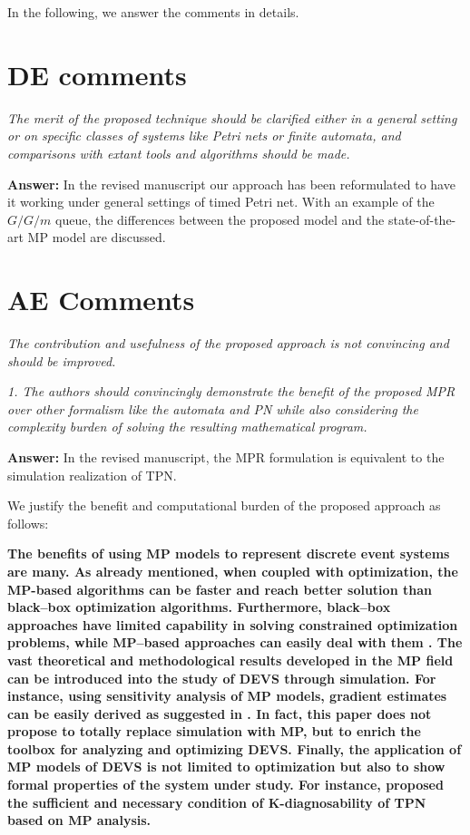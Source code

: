 \documentclass[suppldata]{interact}
\begin{document}
In the following, we answer the comments in details. 



\section{DE comments}
\textit{The merit of the proposed technique should be clarified either in a general setting or on specific classes of systems like Petri nets or finite automata, and comparisons with extant tools and algorithms should be made.}

\noindent
\textbf{Answer:} %
In the revised manuscript our approach %
has been reformulated to have it working under general settings of timed Petri net. With an example of the $G/G/m$ queue, the differences between the proposed model and the state-of-the-art MP model are discussed.


\section{AE Comments}
\textit{The contribution and usefulness of the proposed approach is not convincing and should be improved. }

\textit{1. The authors should convincingly demonstrate the benefit of the proposed MPR over other formalism like the automata and PN while also considering the complexity burden of solving the resulting mathematical program. }

\noindent
\textbf{Answer:} %
In the revised manuscript, the MPR formulation is equivalent to the simulation realization of TPN.

We justify the benefit and computational burden of the proposed approach as follows: 

\textbf{The benefits of using MP models to represent discrete event systems are many. As already mentioned, %
when coupled with optimization, the MP-based algorithms can be faster and %
reach better solution than black--box optimization algorithms. Furthermore, black--box approaches have limited capability in solving constrained optimization problems, %
while MP--based approaches can easily deal with them \citep{zhang2020models}. The vast theoretical and methodological results developed in the MP field can be introduced into the study of DEVS through simulation. For instance, using sensitivity analysis of MP models, gradient estimates can be easily derived as suggested in \citep{chan2008optimization}. In fact, %
this paper does not propose to totally replace simulation with MP, but to enrich the toolbox for analyzing and optimizing DEVS. Finally, the application of MP models of DEVS is not limited to optimization but also to show formal properties of the system under study. For instance, \cite{basile2012k} proposed the sufficient and necessary condition of K-diagnosability of TPN based on MP analysis.} 
\end{document}
